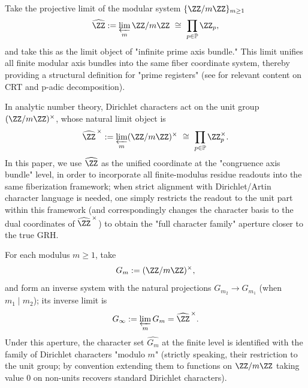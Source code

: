 \begin{definition}\label{def:pom-profinite}
Take the projective limit of the modular system $\{\ZZ/m\ZZ\}_{m\ge 1}$
\[
\widehat{\ZZ}:=\varprojlim_m \ZZ/m\ZZ\ \cong\ \prod_{p\in\mathbb{P}}\ZZ_p,
\]
and take this as the limit object of "infinite prime axis bundle." This limit unifies all finite modular axis bundles into the same fiber coordinate system, thereby providing a structural definition for "prime registers" (see \cite{Apostol1976} for relevant content on CRT and p-adic decomposition).
\end{definition}

\begin{remark}\label{rem:pom-profinite-units}
In analytic number theory, Dirichlet characters act on the unit group $(\ZZ/m\ZZ)^\times$, whose natural limit object is
\[
\widehat{\ZZ}^{\,\times}:=\varprojlim_m (\ZZ/m\ZZ)^\times\ \cong\ \prod_{p\in\mathbb{P}}\ZZ_p^\times.
\]
In this paper, we use $\widehat{\ZZ}$ as the unified coordinate at the "congruence axis bundle" level, in order to incorporate all finite-modulus residue readouts into the same fiberization framework; when strict alignment with Dirichlet/Artin character language is needed, one simply restricts the readout to the unit part within this framework (and correspondingly changes the character basis to the dual coordinates of $\widehat{\ZZ}^{\,\times}$) to obtain the "full character family" aperture closer to the true GRH.
\end{remark}

\begin{definition}\label{def:pom-dirichlet-axis-units}
For each modulus \(m\ge 1\), take
\[
G_m:=(\ZZ/m\ZZ)^\times,
\]
and form an inverse system with the natural projections \(G_{m_2}\to G_{m_1}\) (when \(m_1\mid m_2\)); its inverse limit is
\[
G_\infty:=\varprojlim_m G_m=\widehat{\ZZ}^{\,\times}.
\]
Under this aperture, the character set \(\widehat{G_m}\) at the finite level is identified with the family of Dirichlet characters "modulo \(m\)" (strictly speaking, their restriction to the unit group; by convention extending them to functions on \(\ZZ/m\ZZ\) taking value \(0\) on non-units recovers standard Dirichlet characters).
\end{definition}

